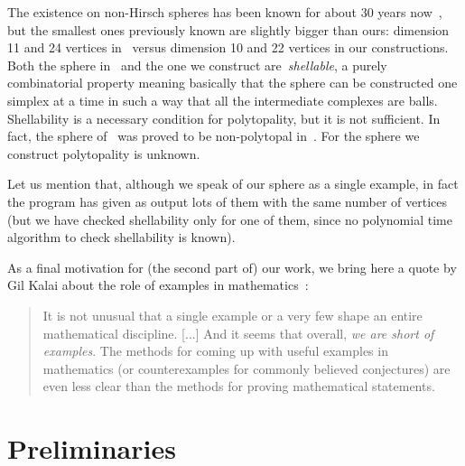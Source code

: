 \documentclass[12pt,a4paper]{article}
\theoremstyle{plain}
\theoremstyle{definition}
\begin{document}
The existence on non-Hirsch spheres has been known for about 30 years now~\cite{ManiWalkup}, but the smallest ones previously known are slightly bigger than ours: dimension 11 and 24 vertices in~\cite{ManiWalkup} versus dimension 10 and 22 vertices in our constructions. Both the sphere in~\cite{ManiWalkup} and the one we construct are~\emph{shellable}, a purely combinatorial property meaning basically that the sphere can be constructed one simplex at a time in such a way that all the intermediate complexes are balls. Shellability is a necessary condition for polytopality, but it is not sufficient. In fact, the sphere of~\cite{ManiWalkup} was proved to be non-polytopal in~\cite{nonPolytopal}. For the sphere we construct polytopality is unknown.

Let us mention that, although we speak of our sphere as a single example, in fact the program has given as output lots of them with the same number of vertices (but we have checked shellability only for one of them, since no polynomial time algorithm to check shellability is known).

As a final motivation for (the second part of) our work, we bring here a quote by Gil Kalai about the role of examples in mathematics~\cite{examples}:

\begin{quote}
It is not unusual that a single example or a very few shape an entire mathematical discipline. [...] And it seems that overall, \emph{we are short of examples}. The methods for coming up with useful examples in mathematics (or counterexamples for commonly believed conjectures) are even less clear than the methods for proving mathematical statements.
\end{quote}

\section{Preliminaries}
\end{document}
